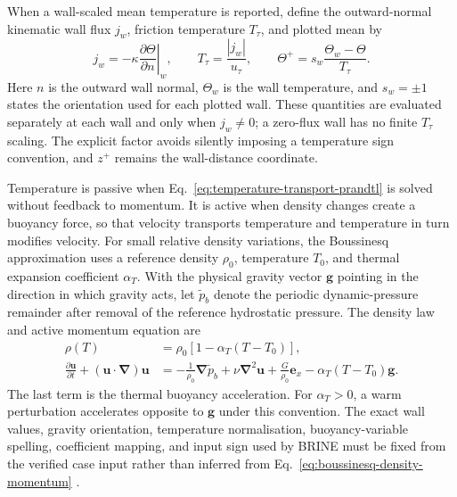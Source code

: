 When a wall-scaled mean temperature is reported, define the outward-normal
kinematic wall flux $j_w$, friction temperature $T_\tau$, and plotted mean by
\begin{equation}
  j_w=-\kappa\left.\frac{\partial\Theta}{\partial n}\right|_w,
  \qquad
  T_\tau=\frac{|j_w|}{u_\tau},
  \qquad
  \Theta^+=s_w\frac{\Theta_w-\Theta}{T_\tau}.
  \label{eq:temperature-wall-scaling}
\end{equation}
Here $n$ is the outward wall normal, $\Theta_w$ is the wall temperature, and
$s_w=\pm1$ states the orientation used for each plotted wall. These quantities
are evaluated separately at each wall and only when $j_w\neq0$; a zero-flux
wall has no finite $T_\tau$ scaling. The explicit factor avoids silently
imposing a temperature sign convention, and $z^+$ remains the wall-distance
coordinate.

Temperature is passive when Eq.~\eqref{eq:temperature-transport-prandtl} is
solved without feedback to momentum. It is active when density changes create
a buoyancy force, so that velocity transports temperature and temperature in
turn modifies velocity. For small relative density variations, the Boussinesq
approximation uses a reference density $\rho_0$, temperature $T_0$, and thermal
expansion coefficient $\alpha_T$. With the physical gravity vector
$\mathbf{g}$ pointing in the direction in which gravity acts, let
$\widetilde p_b$ denote the periodic dynamic-pressure remainder after removal
of the reference hydrostatic pressure. The density law and active momentum
equation are
\begin{equation}
  \begin{aligned}
    \rho(T)&=\rho_0\left[1-\alpha_T(T-T_0)\right],\\
    \frac{\partial\mathbf{u}}{\partial t}
      +(\mathbf{u}\mathbin{\cdot}\boldsymbol{\nabla})\mathbf{u}
      &=-\frac{1}{\rho_0}\boldsymbol{\nabla}\widetilde p_b
        +\nu\boldsymbol{\nabla}^2\mathbf{u}
        +\frac{G}{\rho_0}\mathbf{e}_x
        -\alpha_T(T-T_0)\mathbf{g}.
  \end{aligned}
  \label{eq:boussinesq-density-momentum}
\end{equation}
The last term is the thermal buoyancy acceleration. For $\alpha_T>0$, a warm
perturbation accelerates opposite to $\mathbf{g}$ under this convention. The
exact wall values, gravity orientation, temperature
normalisation, buoyancy-variable spelling, coefficient mapping, and input sign
used by BRINE must be fixed from the verified case input rather than inferred
from Eq.~\eqref{eq:boussinesq-density-momentum} \cite{pope2000}.


